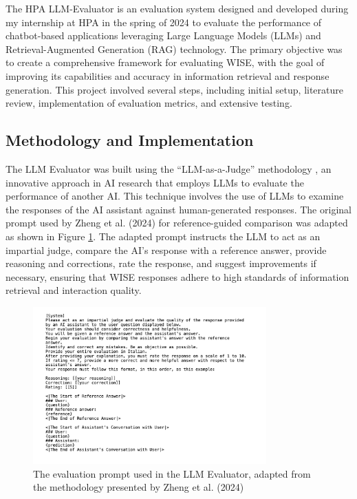 The HPA LLM-Evaluator is an evaluation system designed and developed during my internship at HPA in the spring of 2024 to evaluate the performance of chatbot-based applications leveraging Large Language Models (LLMs) and Retrieval-Augmented Generation (RAG) technology. The primary objective was to create a comprehensive framework for evaluating WISE, with the goal of improving its capabilities and accuracy in information retrieval and response generation. This project involved several steps, including initial setup, literature review, implementation of evaluation metrics, and extensive testing.

\subsection{Methodology and Implementation}

The LLM Evaluator was built using the “LLM-as-a-Judge” methodology \cite{zheng2024judging}, an innovative approach in AI research that employs LLMs to evaluate the performance of another AI. This technique involves the use of LLMs to examine the responses of the AI assistant against human-generated responses. The original prompt used by Zheng et al. (2024) for reference-guided comparison was adapted as shown in Figure \ref{fig:llme-prompt}. The adapted prompt instructs the LLM to act as an impartial judge, compare the AI's response with a reference answer, provide reasoning and corrections, rate the response, and suggest improvements if necessary, ensuring that WISE responses adhere to high standards of information retrieval and interaction quality.

\begin{figure}[h!]
    \centering
    \includegraphics[width=0.8\textwidth]{images/llme/llme-prompt.png}
    \caption{The evaluation prompt used in the LLM Evaluator, adapted from the methodology presented by Zheng et al. (2024)}
    \label{fig:llme-prompt}
\end{figure}

